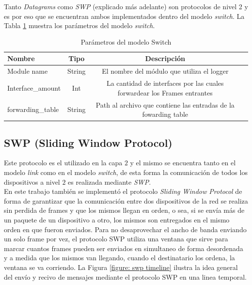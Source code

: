 \documentclass[10pt,a4paper]{article}
\begin{document}
Tanto \textit{Datagrams} como \textit{SWP} (explicado más adelante) son protocolos de nivel 2 y es por eso que se encuentran ambos implementados dentro del modelo \textit{switch}. La Tabla \ref{table: parameters datagrams} muestra los parámetros del modelo \textit{switch}.

\begin{table}[h]
\begin{tabular}{|l|c|c|c|}
  \hline
  \textbf{Nombre} & \textbf{Tipo} & \textbf{Descripción} \\
  \hline
  Module name & String & El nombre del módulo que utiliza el logger \\
  \hline
  Interface\_amount & Int & La cantidad de interfaces por las cuales forwardear los Frames entrantes \\
  \hline
  forwarding\_table & String & Path al archivo que contiene las entradas de la fowarding table \\
  \hline
\end{tabular}
\caption{Parámetros del modelo Switch}
\label{table: parameters datagrams}
\end{table}

\subsection{SWP (Sliding Window Protocol)}

Este protocolo es el utilizado en la capa $2$ y el mismo se encuentra tanto en el modelo \textit{link} como en el modelo \textit{switch}, de esta forma la comunicación de todos los dispositivos a nivel $2$ es realizada mediante \textit{SWP}.\\

En este trabajo también se implementó el protocolo \textit{Sliding Window Protocol} de forma de garantizar que la comunicación entre dos dispositivos de la red se realiza sin perdida de frames y que los mismos llegan en orden, o sea, si se envía más de un paquete de un dispositivo a otro, los mismos son entregados en el mismo orden en que fueron enviados. Para no desaprovechar el ancho de banda enviando un solo frame por vez, el protocolo SWP utiliza una ventana que sirve para marcar cuantos frames pueden ser enviados en simultaneo de forma desordenada y a medida que los mismos van llegando, cuando el destinatario los ordena, la ventana se va corriendo. La Figura \ref{figure: swp timeline} ilustra la idea general del envío y recivo de mensajes mediante el protocolo SWP en una linea temporal.\\
\end{document}
